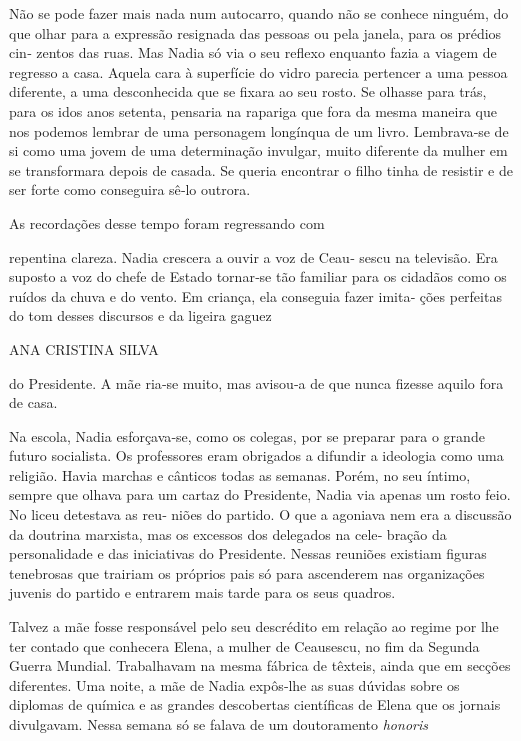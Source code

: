 Não se pode fazer mais nada num autocarro, quando não se conhece
ninguém, do que olhar para a expressão resignada das pessoas ou pela
janela, para os prédios cin‑ zentos das ruas. Mas Nadia só via o seu
reflexo enquanto fazia a viagem de regresso a casa. Aquela cara à
superfície do vidro parecia pertencer a uma pessoa diferente, a uma
desconhecida que se fixara ao seu rosto. Se olhasse para trás, para os
idos anos setenta, pensaria na rapariga que fora da mesma maneira que
nos podemos lembrar de uma personagem longínqua de um livro. Lembrava‑se
de si como uma jovem de uma determinação invulgar, muito diferente da
mulher em se transformara depois de casada. Se queria encontrar o filho
tinha de resistir e de ser forte como conseguira sê‑lo outrora.

As recordações desse tempo foram regressando com

repentina clareza. Nadia crescera a ouvir a voz de Ceau‑ sescu na
televisão. Era suposto a voz do chefe de Estado tornar‑se tão familiar
para os cidadãos como os ruídos da chuva e do vento. Em criança, ela
conseguia fazer imita‑ ções perfeitas do tom desses discursos e da
ligeira gaguez

ANA CRISTINA SILVA

do Presidente. A mãe ria‑se muito, mas avisou‑a de que nunca fizesse
aquilo fora de casa.

Na escola, Nadia esforçava‑se, como os colegas, por se preparar para o
grande futuro socialista. Os professores eram obrigados a difundir a
ideologia como uma religião. Havia marchas e cânticos todas as semanas.
Porém, no seu íntimo, sempre que olhava para um cartaz do Presidente,
Nadia via apenas um rosto feio. No liceu detestava as reu‑ niões do
partido. O que a agoniava nem era a discussão da doutrina marxista, mas
os excessos dos delegados na cele‑ bração da personalidade e das
iniciativas do Presidente. Nessas reuniões existiam figuras tenebrosas
que trairiam os próprios pais só para ascenderem nas organizações
juvenis do partido e entrarem mais tarde para os seus quadros.

Talvez a mãe fosse responsável pelo seu descrédito em relação ao regime
por lhe ter contado que conhecera Elena, a mulher de Ceausescu, no fim
da Segunda Guerra Mundial. Trabalhavam na mesma fábrica de têxteis,
ainda que em secções diferentes. Uma noite, a mãe de Nadia expôs‑lhe as
suas dúvidas sobre os diplomas de química e as grandes descobertas
científicas de Elena que os jornais divulgavam. Nessa semana só se
falava de um doutoramento \emph{honoris}

